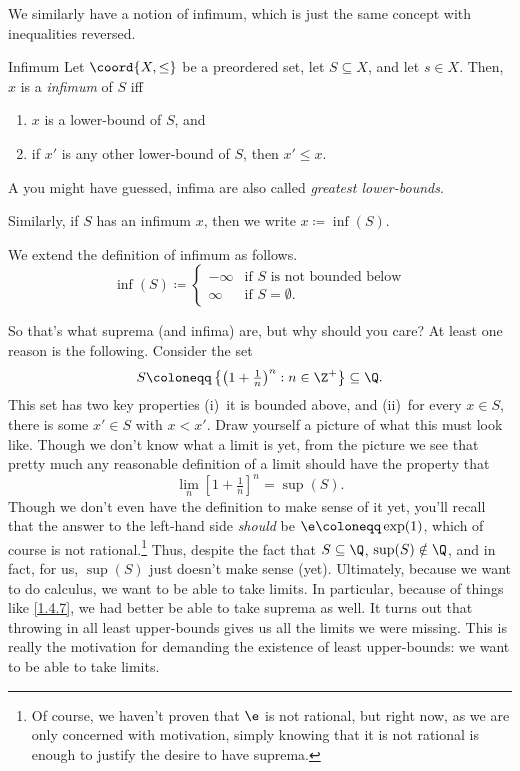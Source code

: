 We similarly have a notion of infimum, which is just the same concept with inequalities reversed.
\begin{dfn}{Infimum}{}
Let $\coord{X,\leq}$ be a preordered set, let $S\subseteq X$, and let $s\in X$.  Then, $x$ is a \emph{infimum} of $S$ iff
\begin{enumerate}
\item $x$ is a lower-bound of $S$, and
\item if $x'$ is any other lower-bound of $S$, then $x'\leq x$.
\end{enumerate}
\begin{rmk}
A you might have guessed, infima are also called \emph{greatest lower-bounds}.
\end{rmk}
\begin{rmk}
Similarly, if $S$ has an infimum $x$, then we write $x\coloneqq \inf (S)$.
\end{rmk}
We extend the definition of infimum as follows.
\begin{equation}
\inf (S)\coloneqq \begin{cases}-\infty & \text{if }S\text{ is not bounded below} \\ \infty & \text{if }S=\emptyset .\end{cases}
\end{equation}
\end{dfn}

So that's what suprema (and infima) are, but why should you care?  At least one reason is the following.  Consider the set
\begin{equation}
S\coloneqq \left\{ \left( 1+\tfrac{1}{n}\right) ^n:n\in \Z ^+\right\} \subseteq \Q .
\end{equation}
This set has two key properties (i)~it is bounded above, and (ii)~for every $x\in S$, there is some $x'\in S$ with $x<x'$.  Draw yourself a picture of what this must look like.  Though we don't know what a limit is yet, from the picture we see that pretty much any reasonable definition of a limit should have the property that
\begin{equation}\label{1.4.7}
\lim _n\left[ 1+\tfrac{1}{n}\right] ^n=\sup (S).
\end{equation}
Though we don't even have the definition to make sense of it yet, you'll recall that the answer to the left-hand side \emph{should} be $\e \coloneqq \exp (1)$, which of course is not rational.\footnote{Of course, we haven't proven that $\e$ is not rational, but right now, as we are only concerned with motivation, simply knowing that it is not rational is enough to justify the desire to have suprema.}  Thus, despite the fact that $S\subseteq \Q$, $\sup (S)\notin \Q$, and in fact, for us, $\sup (S)$ just doesn't make sense (yet).  Ultimately, because we want to do calculus, we want to be able to take limits.  In particular, because of things like \eqref{1.4.7}, we had better be able to take suprema as well.  It turns out that throwing in all least upper-bounds gives us all the limits we were missing.  This is really the motivation for demanding the existence of least upper-bounds:  we want to be able to take limits.

